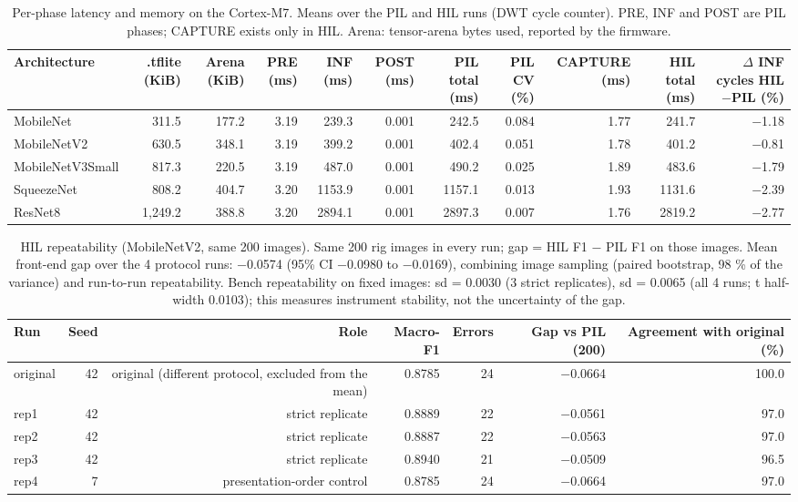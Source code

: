 \begin{table}[htbp]
\centering
\scriptsize
\caption{Per-phase latency and memory on the Cortex-M7. Means over the PIL and HIL runs (DWT cycle counter). PRE, INF and POST are PIL phases; CAPTURE exists only in HIL. Arena: tensor-arena bytes used, reported by the firmware.}
\label{tab:ladder3}
\begin{tabular}{lrrrrrrrrrr}
\toprule
Architecture & .tflite (KiB) & Arena (KiB) & PRE (ms) & INF (ms) & POST (ms) & PIL total (ms) & PIL CV (\%) & CAPTURE (ms) & HIL total (ms) & $\Delta$ INF cycles HIL$-$PIL (\%) \\
\midrule
MobileNet & 311.5 & 177.2 & 3.19 & 239.3 & 0.001 & 242.5 & 0.084 & 1.77 & 241.7 & $-$1.18 \\
MobileNetV2 & 630.5 & 348.1 & 3.19 & 399.2 & 0.001 & 402.4 & 0.051 & 1.78 & 401.2 & $-$0.81 \\
MobileNetV3Small & 817.3 & 220.5 & 3.19 & 487.0 & 0.001 & 490.2 & 0.025 & 1.89 & 483.6 & $-$1.79 \\
SqueezeNet & 808.2 & 404.7 & 3.20 & 1153.9 & 0.001 & 1157.1 & 0.013 & 1.93 & 1131.6 & $-$2.39 \\
ResNet8 & 1,249.2 & 388.8 & 3.20 & 2894.1 & 0.001 & 2897.3 & 0.007 & 1.76 & 2819.2 & $-$2.77 \\
\bottomrule
\end{tabular}
\end{table}

\begin{table}[htbp]
\centering
\scriptsize
\caption{HIL repeatability (MobileNetV2, same 200 images). Same 200 rig images in every run; gap = HIL F1 $-$ PIL F1 on those images. Mean front-end gap over the 4 protocol runs: $-$0.0574 (95\% CI $-$0.0980 to $-$0.0169), combining image sampling (paired bootstrap, 98 \% of the variance) and run-to-run repeatability. Bench repeatability on fixed images: sd = 0.0030 (3 strict replicates), sd = 0.0065 (all 4 runs; t half-width 0.0103); this measures instrument stability, not the uncertainty of the gap.}
\label{tab:ladder4}
\begin{tabular}{lrrrrrr}
\toprule
Run & Seed & Role & Macro-F1 & Errors & Gap vs PIL (200) & Agreement with original (\%) \\
\midrule
original & 42 & original (different protocol, excluded from the mean) & 0.8785 & 24 & $-$0.0664 & 100.0 \\
rep1 & 42 & strict replicate & 0.8889 & 22 & $-$0.0561 & 97.0 \\
rep2 & 42 & strict replicate & 0.8887 & 22 & $-$0.0563 & 97.0 \\
rep3 & 42 & strict replicate & 0.8940 & 21 & $-$0.0509 & 96.5 \\
rep4 & 7 & presentation-order control & 0.8785 & 24 & $-$0.0664 & 97.0 \\
\bottomrule
\end{tabular}
\end{table}

